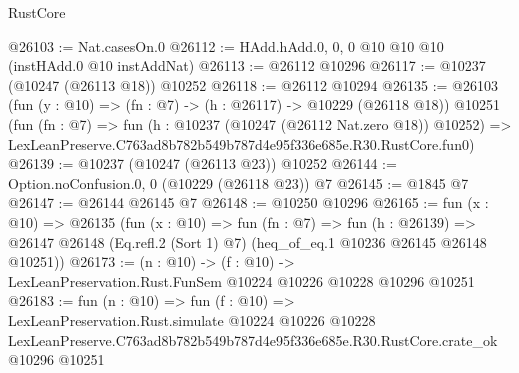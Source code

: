 \begin{lexlean}{RustCore}
\begin{coremodule}
@26103 := Nat.casesOn.{0}
@26112 := HAdd.hAdd.{0, 0, 0} @10 @10 @10 (instHAdd.{0} @10 instAddNat)
@26113 := @26112 @10296
@26117 := @10237 (@10247 (@26113 @18)) @10252
@26118 := @26112 @10294
@26135 := @26103
    (fun (y : @10) => (fn : @7) -> (h : @26117) -> @10229 (@26118 @18))
    @10251
    (fun (fn : @7) =>
    fun (h : @10237 (@10247 (@26112 Nat.zero @18)) @10252) =>
    LexLeanPreserve.C763ad8b782b549b787d4e95f336e685e.R30.RustCore.fun0)
@26139 := @10237 (@10247 (@26113 @23)) @10252
@26144 := Option.noConfusion.{0, 0} (@10229 (@26118 @23)) @7
@26145 := @1845 @7
@26147 := @26144 @26145 @7
@26148 := @10250 @10296
@26165 := fun (x : @10) =>
  @26135
    (fun (x : @10) =>
    fun (fn : @7) =>
    fun (h : @26139) =>
    @26147 @26148 (Eq.refl.{2} (Sort 1) @7) (heq_of_eq.{1} @10236 @26145 @26148 @10251))
@26173 := (n : @10) ->
  (f : @10) -> LexLeanPreservation.Rust.FunSem @10224 @10226 @10228 @10296 @10251
@26183 := fun (n : @10) =>
  fun (f : @10) =>
  LexLeanPreservation.Rust.simulate
    @10224
    @10226
    @10228
    LexLeanPreserve.C763ad8b782b549b787d4e95f336e685e.R30.RustCore.crate_ok
    @10296
    @10251
\end{coremodule}
\end{lexlean}
